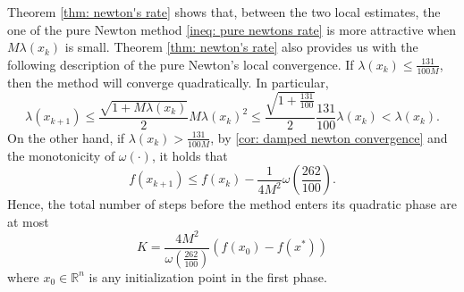 \documentclass[sn-mathphys-num]{sn-jnl}%
\newcommand{\R}{\mathbb{R}}
\theoremstyle{thmstyleone}%
\theoremstyle{thmstyletwo}%
\theoremstyle{thmstylethree}%
\numberwithin{equation}{section}
\begin{document}
Theorem \ref{thm: newton's rate} shows that, between the two local estimates, the one of the pure Newton method \eqref{ineq: pure newtons rate} is more attractive when $ M \lambda(x_{k})$ is small. Theorem \ref{thm: newton's rate} also provides us with the following description of the pure Newton's local convergence. If $\lambda(x_k) \leq \frac{131}{100M}$, then the method will converge quadratically. In particular, 
\begin{equation*}
    \lambda(x_{k+1}) \leq  \frac{\sqrt{1 + M \lambda(x_{k})}}{2} M \lambda(x_{k})^2 \leq 
    \frac{\sqrt{1 + \frac{131}{100}}}{2} \frac{131}{100} \lambda(x_{k}) < \lambda(x_{k}).
\end{equation*}
On the other hand, if $\lambda(x_k) > \frac{131}{100M}$, by \cref{cor: damped newton convergence} and the monotonicity of $\omega(\cdot)$, it holds that
    \begin{equation*}
        f(x_{k+1}) \leq f(x_{k}) - \frac{1}{4M^2} \omega\left(\frac{262}{100}\right).
    \end{equation*}
Hence, the total number of steps before the method enters its quadratic phase are at most
\begin{equation*}
    K = \frac{4M^2}{\omega\left(\frac{262}{100}\right)} \left( f(x_0) - f(x^*)\right)
\end{equation*}
where $x_0 \in \R^n$ is any initialization point in the first phase.
\end{document}
